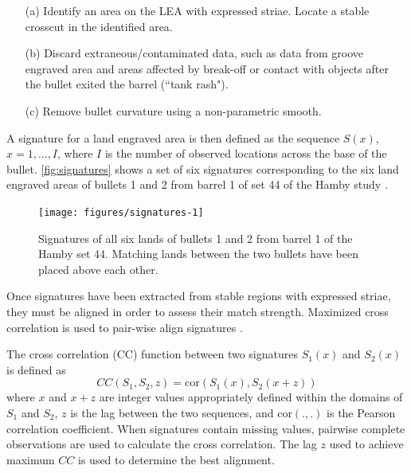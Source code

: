 \documentclass[doubleblind]{elsarticle}\usepackage[]{graphicx}\usepackage[]{color}
\newenvironment{knitrout}{}{} %
\begin{document}
\begin{itemize}
\item[(a)] Identify an area on the LEA with expressed striae. Locate a stable crosscut in the identified area.
\item[(b)] Discard extraneous/contaminated data, such as data from groove engraved area and areas affected by break-off or contact with objects after the bullet exited the barrel  (``tank rash").
\item[(c)] Remove bullet curvature using a non-parametric smooth. 
\end{itemize}
A signature for a land engraved area is then defined as the sequence $S(x)$, $x = 1, ..., I$, where $I$ is the number of observed locations across the base of the bullet. \autoref{fig:signatures} shows a set of six signatures corresponding to the six land engraved areas of bullets 1 and 2 from barrel 1 of set 44 of the Hamby study \citep{hamby}. 
\begin{knitrout}
\color{fgcolor}\begin{figure}

{\centering \texttt{[image: figures/signatures-1]} 

}

\caption[Signatures of all six lands of bullets 1 and 2 from barrel 1 of the Hamby set 44]{Signatures of all six lands of bullets 1 and 2 from barrel 1 of the Hamby set 44. Matching lands between the two bullets have been placed above each other.}\label{fig:signatures}
\end{figure}


\end{knitrout}

Once signatures have been extracted from stable regions with expressed striae, they must be aligned in order to assess their match strength. Maximized cross correlation is used to pair-wise align signatures \citep{aoas2,vorburgerApplicationsCrosscorrelationFunctions2011}. 

The cross correlation (CC) function between two signatures $S_1(x)$ and $S_2(x)$ is defined as 
\[
CC(S_1, S_2, z) = \text{cor}\left(S_1(x), S_2(x + z)\right)
\] 
where $x$ and $x+z$ are integer values appropriately defined within the domains of $S_1$ and $S_2$, $z$ is the lag between the two sequences, and $\text{cor}(.,.)$ is the Pearson correlation coefficient.
When signatures contain missing values, pairwise complete observations are used to calculate the cross correlation. The lag $z$ used to achieve maximum $CC$ is used to determine the best alignment.
\end{document}
